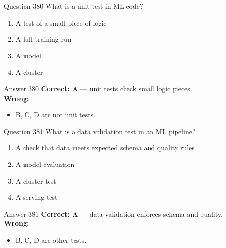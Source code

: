 \documentclass[aspectratio=169,11pt]{beamer}
\begin{document}
	\begin{frame}{Question 380}
		What is a unit test in ML code?
		\begin{enumerate}[label=\Alph*.]
			\item A test of a small piece of logic
			\item A full training run
			\item A model
			\item A cluster
		\end{enumerate}
	\end{frame}
	\begin{frame}{Answer 380}
		\textbf{Correct: A} --- unit tests check small logic pieces.\\
		\vspace{0.5em}
		\textbf{Wrong:}
		\begin{itemize}
			\item B, C, D are not unit tests.
		\end{itemize}
	\end{frame}
	
	\begin{frame}{Question 381}
		What is a data validation test in an ML pipeline?
		\begin{enumerate}[label=\Alph*.]
			\item A check that data meets expected schema and quality rules
			\item A model evaluation
			\item A cluster test
			\item A serving test
		\end{enumerate}
	\end{frame}
	\begin{frame}{Answer 381}
		\textbf{Correct: A} --- data validation enforces schema and quality.\\
		\vspace{0.5em}
		\textbf{Wrong:}
		\begin{itemize}
			\item B, C, D are other tests.
		\end{itemize}
	\end{frame}
	
\end{document}
